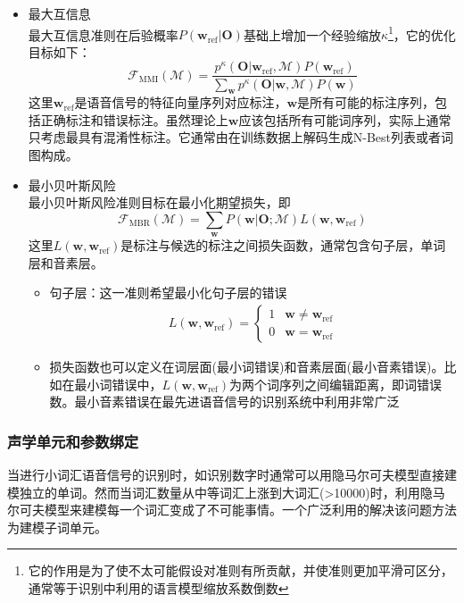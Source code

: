 \begin{itemize}
    \item 最大互信息 \\
    最大互信息准则在后验概率$P(\mathbf{w}_{\text{ref}}|\mathbf{O})$基础上增加一个经验缩放$\kappa$\footnote{它的作用是为了使不太可能假设对准则有所贡献，并使准则更加平滑可区分，通常等于识别中利用的语言模型缩放系数倒数}，它的优化目标如下：
    \begin{equation}
        \mathcal{F}_{\text{MMI}}(\mathcal{M})=\frac{p^{\kappa}(\mathbf{O}|\mathbf{w}_{\text{ref}},\mathcal{M})P(\mathbf{w}_{\text{ref}})}{\sum_{\mathbf{w}}p^{\kappa}(\mathbf{O}|\mathbf{w},\mathcal{M})P(\mathbf{w})}
    \end{equation}
    这里$\mathbf{w}_{\text{ref}}$是语音信号的特征向量序列对应标注，$\mathbf{w}$是所有可能的标注序列，包括正确标注和错误标注。虽然理论上$\mathbf{w}$应该包括所有可能词序列，实际上通常只考虑最具有混淆性标注。它通常由在训练数据上解码生成N-Best列表或者词图构成。
    \item 最小贝叶斯风险 \\
    最小贝叶斯风险准则目标在最小化期望损失，即
    \begin{equation}
        \mathcal{F}_{\text{MBR}}(\mathcal{M})=\sum_{\mathbf{w}}P(\mathbf{w}|\mathbf{O};\mathcal{M})L(\mathbf{w},\mathbf{w}_{\text{ref}})
    \end{equation}
    这里$L(\mathbf{w},\mathbf{w}_{\text{ref}})$是标注与候选的标注之间损失函数，通常包含句子层，单词层和音素层。
    \begin{itemize}
        \item 句子层：这一准则希望最小化句子层的错误
        \begin{eqnarray}
            L(\mathbf{w},\mathbf{w}_{\text{ref}})=
            \begin{cases}
                1& \mathbf{w} \ne \mathbf{w}_{\text{ref}} \\
                0& \mathbf{w} = \mathbf{w}_{\text{ref}}
            \end{cases}
        \end{eqnarray}
        \item 损失函数也可以定义在词层面(最小词错误)和音素层面(最小音素错误)。比如在最小词错误中，$L(\mathbf{w},\mathbf{w}_{\text{ref}})$为两个词序列之间编辑距离，即词错误数。最小音素错误在最先进语音信号的识别系统中利用非常广泛~\cite{povey2005discriminative}
    \end{itemize}
\end{itemize}

\subsubsection{声学单元和参数绑定}
当进行小词汇语音信号的识别时，如识别数字时通常可以用隐马尔可夫模型直接建模独立的单词。然而当词汇数量从中等词汇上涨到大词汇(>10000)时，利用隐马尔可夫模型来建模每一个词汇变成了不可能事情。一个广泛利用的解决该问题方法为建模子词单元。

